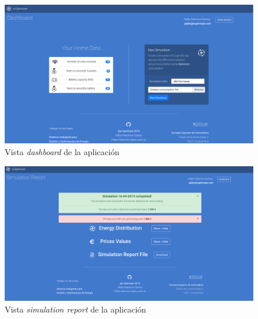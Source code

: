 \begin{figure}[H]
            \centering
            \includegraphics[width=17cm]{figs/dashboard.png}
            \caption{Vista \textit{dashboard} de la aplicación}
            \label{fig:dashboard}
\end{figure}
\begin{figure}[H]
            \centering
            \includegraphics[width=17cm]{figs/simulation.png}
            \caption{Vista \textit{simulation report} de la aplicación}
            \label{fig:simulationView}
\end{figure}

